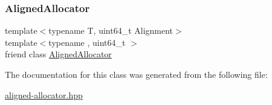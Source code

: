 \subsubsection{\texorpdfstring{Aligned\+Allocator}{AlignedAllocator}}
{\footnotesize\ttfamily template$<$typename T, uint64\+\_\+t Alignment$>$ \\
template$<$typename , uint64\+\_\+t $>$ \\
friend class \hyperlink{classintel_1_1hexl_1_1AlignedAllocator}{Aligned\+Allocator}\hspace{0.3cm}{\ttfamily [friend]}}



The documentation for this class was generated from the following file\+:\begin{DoxyCompactItemize}
\item 
\hyperlink{aligned-allocator_8hpp}{aligned-\/allocator.\+hpp}\end{DoxyCompactItemize}
